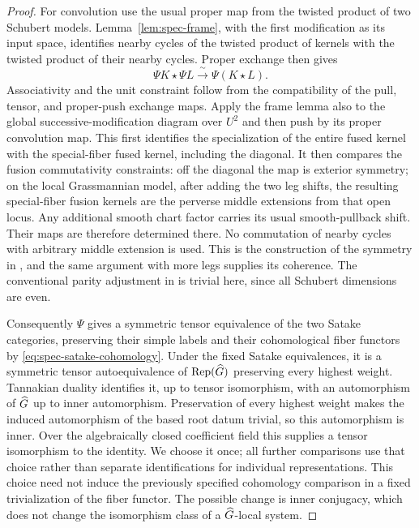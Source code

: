 \begin{proof}
For convolution use the usual proper map from the twisted product of
two Schubert models.  Lemma~\ref{lem:spec-frame}, with the first
modification as its input space, identifies nearby cycles of the twisted
product of kernels with the twisted product of their nearby cycles.
Proper exchange then gives
\begin{equation}\label{eq:spec-convolution-kernels}
 \Psi K\star\Psi L\xrightarrow{\ \sim\ }\Psi(K\star L).
\end{equation}
Associativity and the unit constraint follow from the compatibility of
the pull, tensor, and proper-push exchange maps.  Apply the frame lemma
also to the global successive-modification diagram over $U^2$ and then
push by its proper convolution map.  This first identifies the
specialization of the entire fused kernel with the special-fiber fused
kernel, including the diagonal.  It then compares the fusion
commutativity constraints: off the diagonal the map is exterior symmetry;
on the local Grassmannian model, after adding the two leg shifts, the
resulting special-fiber fusion kernels are the perverse middle extensions
from that open locus.  Any additional smooth chart factor carries its
usual smooth-pullback shift.  Their
maps are therefore determined there.  No commutation of nearby cycles
with arbitrary middle extension is used.  This is the construction of
the symmetry in \cite[\S5, especially~(5.10)--(5.11)]{MV}, and the same
argument with more legs supplies its coherence.  The conventional parity
adjustment in \cite[\S6]{MV} is trivial here, since all Schubert
dimensions are even.

Consequently $\Psi$ gives a symmetric tensor equivalence of the two
Satake categories, preserving their simple labels and their
cohomological fiber functors by
\eqref{eq:spec-satake-cohomology}.  Under the fixed Satake equivalences,
it is a symmetric tensor autoequivalence of $\operatorname{Rep}(\widehat G)$ preserving every
highest weight.  Tannakian duality identifies it, up to tensor
isomorphism, with an automorphism of $\widehat G$ up to inner automorphism.
Preservation of every highest weight makes the induced automorphism of
the based root datum trivial, so this automorphism is inner.  Over the
algebraically closed coefficient field this supplies a tensor
isomorphism to the identity.  We choose it once; all further comparisons
use that choice rather than separate identifications for individual
representations.  This choice need not induce the previously specified
cohomology comparison in a fixed trivialization of the fiber functor.
The possible change is inner conjugacy, which does not change the
isomorphism class of a $\widehat G$-local system.
\end{proof}


